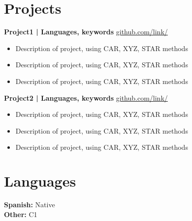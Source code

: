 \documentclass[11pt]{article}
\begin{document}
\section*{Projects}

\textbf{Project1 | Languages, keywords} \hfill \href{https://github.com/}{github.com/link/} \\
\begin{itemize}
  \item Description of project, using CAR, XYZ, STAR methods
  \item Description of project, using CAR, XYZ, STAR methods
  \item Description of project, using CAR, XYZ, STAR methods
\end{itemize}

\textbf{Project2 | Languages, keywords} \hfill \href{https://github.com/}{github.com/link/} \\
\begin{itemize}
  \item Description of project, using CAR, XYZ, STAR methods
  \item Description of project, using CAR, XYZ, STAR methods
  \item Description of project, using CAR, XYZ, STAR methods
\end{itemize}


\section{Languages}
\textbf{Spanish:} Native\\
\textbf{Other:} C1
\end{document}
